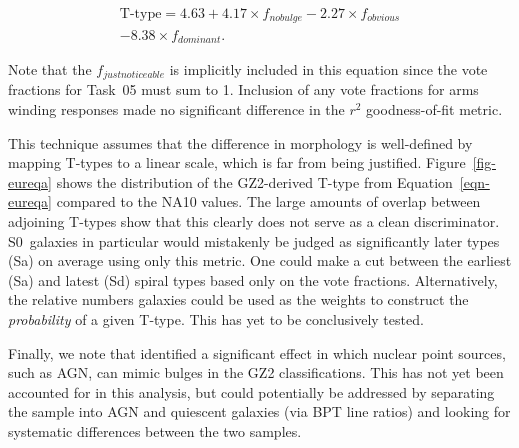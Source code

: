 \documentclass[useAMS,usenatbib]{mn2e}
\begin{document}
\begin{eqnarray}
\label{eqn-eureqa}
\text{T-type} = 4.63 + 4.17\times f_{no bulge} - 2.27\times f_{obvious} \\ \nonumber
- 8.38\times f_{dominant}.
\end{eqnarray}

\noindent Note that the $f_{just noticeable}$ is implicitly included in this equation since the vote fractions for Task~05 must sum to 1. Inclusion of any vote fractions for arms winding responses made no significant difference in the $r^2$ goodness-of-fit metric.

This technique assumes that the difference in morphology is well-defined by mapping T-types to a linear scale, which is far from being justified. Figure~\ref{fig-eureqa} shows the distribution of the GZ2-derived T-type from Equation~\ref{eqn-eureqa} compared to the NA10 values. The large amounts of overlap between adjoining T-types show that this clearly does not serve as a clean discriminator. S0~galaxies in particular would mistakenly be judged as significantly later types (Sa) on average using only this metric. One could make a cut between the earliest (Sa) and latest (Sd) spiral types based only on the vote fractions. Alternatively, the relative numbers galaxies could be used as the weights to construct the {\em probability} of a given T-type. This has yet to be conclusively tested. 

Finally, we note that \citet{sim13} identified a significant effect in which nuclear point sources, such as AGN, can mimic bulges in the GZ2 classifications. This has not yet been accounted for in this analysis, but could potentially be addressed by separating the sample into AGN and quiescent galaxies (via BPT line ratios) and looking for systematic differences between the two samples. 

%
\end{document}
